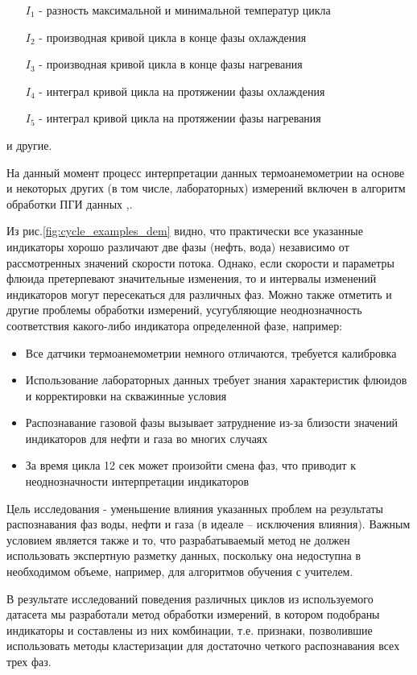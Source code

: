 \begin{enumerate}
    \item[$I_1$] - разность максимальной и минимальной температур цикла
    \item[$I_2$] - производная кривой цикла в конце фазы охлаждения
    \item[$I_3$] - производная кривой цикла в конце фазы нагревания
    \item[$I_4$] - интеграл кривой цикла на протяжении фазы охлаждения
    \item[$I_5$] - интеграл кривой цикла на протяжении фазы нагревания
\end{enumerate}
и другие.
\par
На данный момент процесс интерпретации данных термоанемометрии на основе  и некоторых других (в том числе, лабораторных) измерений включен в алгоритм обработки ПГИ данных \cite{horizonal_1},\cite{horizonal_2}.
\par
Из рис.\ref{fig:cycle_examples_dem} видно, что практически все указанные индикаторы хорошо различают две фазы (нефть, вода) независимо от рассмотренных значений скорости потока. Однако, если скорости и параметры флюида претерпевают значительные изменения, то и интервалы изменений индикаторов могут пересекаться для различных фаз. Можно также отметить и другие проблемы обработки измерений, усугубляющие неоднозначность соответствия какого-либо индикатора определенной фазе, например:
\begin{itemize}
    \item Все датчики термоанемометрии немного отличаются, требуется калибровка
    \item Использование лабораторных данных требует знания характеристик флюидов и корректировки на скважинные условия
    \item Распознавание газовой фазы вызывает затруднение из-за близости значений индикаторов для нефти и газа во многих случаях
    \item За время цикла 12 сек может произойти смена фаз, что приводит к неоднозначности интерпретации индикаторов
\end{itemize}
\par
Цель исследования - уменьшение влияния указанных проблем на результаты распознавания фаз воды, нефти и газа (в идеале – исключения влияния). Важным условием является также и то, что разрабатываемый метод не должен использовать экспертную разметку данных, поскольку она недоступна в необходимом объеме, например, для алгоритмов обучения с учителем.
\par
В результате исследований поведения различных циклов из используемого датасета мы разработали метод обработки измерений, в котором подобраны индикаторы и составлены из них комбинации, т.е. признаки, позволившие использовать методы кластеризации для достаточно четкого распознавания всех трех фаз.

